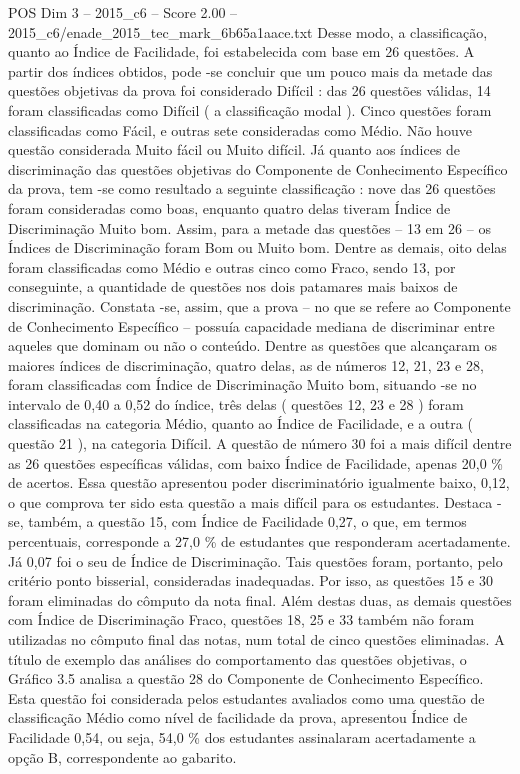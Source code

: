 \begin{textsample}{POS Dim 3 – 2015\_c6 – Score 2.00 – 2015\_c6/enade\_2015\_tec\_mark\_6b65a1aace.txt}
Desse modo, a classificação, quanto ao Índice de Facilidade, foi estabelecida com base em 26 questões.
A partir dos índices obtidos, pode -se concluir que um pouco mais da metade das questões objetivas da prova foi considerado Difícil : das 26 questões válidas, 14 foram classificadas como Difícil ( a classificação modal ).
Cinco questões foram classificadas como Fácil, e outras sete consideradas como Médio.
Não houve questão considerada Muito fácil ou Muito difícil.
Já quanto aos índices de discriminação das questões objetivas do Componente de Conhecimento Específico da prova, tem -se como resultado a seguinte classificação : nove das 26 questões foram consideradas como boas, enquanto quatro delas tiveram Índice de Discriminação Muito bom.
Assim, para a metade das questões – 13 em 26 – os Índices de Discriminação foram Bom ou Muito bom.
Dentre as demais, oito delas foram classificadas como Médio e outras cinco como Fraco, sendo 13, por conseguinte, a quantidade de questões nos dois patamares mais baixos de discriminação.
Constata -se, assim, que a prova – no que se refere ao Componente de Conhecimento Específico – possuía capacidade mediana de discriminar entre aqueles que dominam ou não o conteúdo.
Dentre as questões que alcançaram os maiores índices de discriminação, quatro delas, as de números 12, 21, 23 e 28, foram classificadas com Índice de Discriminação Muito bom, situando -se no intervalo de 0,40 a 0,52 do índice, três delas ( questões 12, 23 e 28 ) foram classificadas na categoria Médio, quanto ao Índice de Facilidade, e a outra ( questão 21 ), na categoria Difícil.
A questão de número 30 foi a mais difícil dentre as 26 questões específicas válidas, com baixo Índice de Facilidade, apenas 20,0 \% de acertos.
Essa questão apresentou poder discriminatório igualmente baixo, 0,12, o que comprova ter sido esta questão a mais difícil para os estudantes.
Destaca -se, também, a questão 15, com Índice de Facilidade 0,27, o que, em termos percentuais, corresponde a 27,0 \% de estudantes que responderam acertadamente.
Já 0,07 foi o seu de Índice de Discriminação.
Tais questões foram, portanto, pelo critério ponto bisserial, consideradas inadequadas.
Por isso, as questões 15 e 30 foram eliminadas do cômputo da nota final.
Além destas duas, as demais questões com Índice de Discriminação Fraco, questões 18, 25 e 33 também não foram utilizadas no cômputo final das notas, num total de cinco questões eliminadas.
A título de exemplo das análises do comportamento das questões objetivas, o Gráfico 3.5 analisa a questão 28 do Componente de Conhecimento Específico.
Esta questão foi considerada pelos estudantes avaliados como uma questão de classificação Médio como nível de facilidade da prova, apresentou Índice de Facilidade 0,54, ou seja, 54,0 \% dos estudantes assinalaram acertadamente a opção B, correspondente ao gabarito.

\end{textsample}
